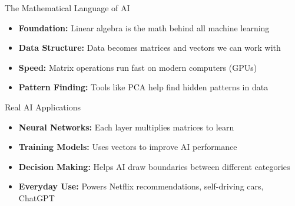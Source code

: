 
\begin{frame}{The Mathematical Language of AI}
    \begin{itemize} 
        \item \textbf{Foundation:} Linear algebra is the math behind all machine learning
        \item \textbf{Data Structure:} Data becomes matrices and vectors we can work with
        \item \textbf{Speed:} Matrix operations run fast on modern computers (GPUs)
        \item \textbf{Pattern Finding:} Tools like PCA help find hidden patterns in data
    \end{itemize}
\end{frame}

\begin{frame}{Real AI Applications}
    \begin{itemize}
        \item \textbf{Neural Networks:} Each layer multiplies matrices to learn
        \item \textbf{Training Models:} Uses vectors to improve AI performance
        \item \textbf{Decision Making:} Helps AI draw boundaries between different categories
        \item \textbf{Everyday Use:} Powers Netflix recommendations, self-driving cars, ChatGPT
    \end{itemize}
\end{frame}